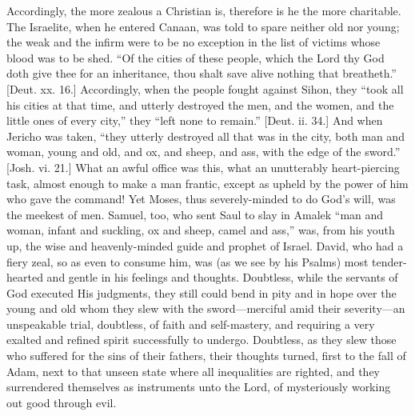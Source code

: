Accordingly, the more zealous a Christian is, therefore is he the
more charitable. The Israelite, when he entered Canaan, was told to
spare neither old nor young; the weak and the infirm were to be no
exception in the list of victims whose blood was to be shed. ``Of
the cities of these people, which the Lord thy God doth give thee for
an inheritance, thou shalt save alive nothing that breatheth.''
[Deut. xx. 16.] Accordingly, when the people fought against Sihon,
they ``took all his cities at that time, and utterly destroyed the
men, and the women, and the little ones of every city,'' they
``left none to remain.'' [Deut. ii. 34.] And when Jericho was
taken, ``they utterly destroyed all that was in the city, both man
and woman, young and old, and ox, and sheep, and ass, with the edge of
the sword.'' [Josh. vi. 21.] What an awful office was this, what
an unutterably heart-piercing task, almost enough to make a man
frantic, except as upheld by the power of him who gave the command!
Yet Moses, thus severely-minded to do God's will, was the meekest of
men. Samuel, too, who sent Saul to slay in Amalek ``man and woman,
infant and suckling, ox and sheep, camel and ass,'' was, from his
youth up, the wise and heavenly-minded guide and prophet of Israel.
David, who had a fiery zeal, so as even to consume him, was (as we see
by his Psalms) most tender-hearted and gentle in his feelings and
thoughts. Doubtless, while the servants of God executed His judgments,
they still could bend in pity and in hope over the young and old whom
they slew with the sword—merciful amid their severity—an
unspeakable trial, doubtless, of faith and self-mastery, and requiring
a very exalted and refined spirit successfully to undergo. Doubtless,
as they slew those who suffered for the sins of their fathers, their
thoughts turned, first to the fall of Adam, next to that unseen state
where all inequalities are righted, and they surrendered themselves as
instruments unto the Lord, of mysteriously working out good through
evil.

